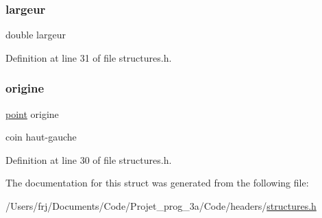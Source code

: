 \subsubsection{\texorpdfstring{largeur}{largeur}}
{\footnotesize\ttfamily double largeur}



Definition at line 31 of file structures.\+h.

\hypertarget{structrectangle_a52a08a00d432ad1428716bbc5659e634}{}\label{structrectangle_a52a08a00d432ad1428716bbc5659e634} 
\subsubsection{\texorpdfstring{origine}{origine}}
{\footnotesize\ttfamily \hyperlink{structpoint}{point} origine}

coin haut-\/gauche 

Definition at line 30 of file structures.\+h.



The documentation for this struct was generated from the following file\+:\begin{DoxyCompactItemize}
\item 
/\+Users/frj/\+Documents/\+Code/\+Projet\+\_\+prog\+\_\+3a/\+Code/headers/\hyperlink{structures_8h}{structures.\+h}\end{DoxyCompactItemize}
